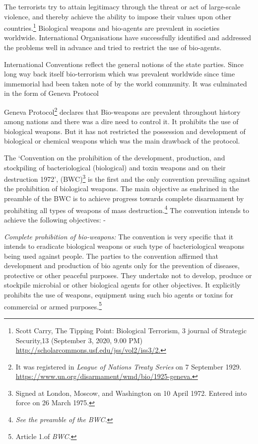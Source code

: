 \begin{multicols}{2}

\noi
The terrorists try to attain legitimacy through the threat or act of large-scale violence, and
thereby achieve the ability to impose their values upon other countries.\footnote{Scott Carry, The Tipping Point: Biological Terrorism, 3 journal of Strategic Security,13 (September 3, 2020,
9.00 PM) \url{http://scholarcommons.usf.edu/jss/vol2/iss3/2.}} Biological weapons
and bio-agents are prevalent in societies worldwide. International Organisations have
successfully identified and addressed the problems well in advance and tried to restrict the
use of bio-agents.


\noi
International Conventions reflect the general notions of the state parties. Since long way back
itself bio-terrorism which was prevalent worldwide since time immemorial had been taken
note of by the world community. It was culminated in the form of Geneva Protocol


\noi
Geneva Protocol\footnote{It was registered in \textit{League of Nations Treaty Series} on 7 September
1929. \url{https://www.un.org/disarmament/wmd/bio/1925-geneva.}} declares that Bio-weapons are prevalent throughout history among nations
and there was a dire need to control it. It prohibits the use of biological weapons. But it has
not restricted the possession and development of biological or chemical weapons which was
the main drawback of the protocol.


\noi
The ‘Convention on the prohibition of the development, production, and stockpiling of
bacteriological (biological) and toxin weapons and on their destruction 1972’, (BWC)\footnote{Signed at London, Moscow, and Washington on 10 April 1972. Entered into force on 26 March 1975.} is the 
first and the only convention prevailing against the prohibition of biological weapons. The
main objective as enshrined in the preamble of the BWC is to achieve progress towards
complete disarmament by prohibiting all types of weapons of mass destruction.\footnote{\textit{See the preamble of the BWC.}} The
convention intends to achieve the following objectives: -

\noi
\textit{Complete prohibition of bio-weapons:} The convention is very specific that it intends to
eradicate biological weapons or such type of bacteriological weapons being used against
people. The parties to the convention affirmed that development and production of bio agents
only for the prevention of diseases, protective or other peaceful purposes. They undertake not
to develop, produce or stockpile microbial or other biological agents for other objectives. It
explicitly prohibits the use of weapons, equipment using such bio agents or toxins for
commercial or armed purposes.\footnote{Article 1.of \textit{BWC.}}


\end{multicols}
